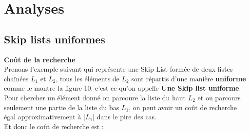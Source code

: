 \documentclass[hidelinks,a4paper,12pt]{article}
\begin{document}
\newpage

 \section{Analyses}
 \subsection{Skip lists uniformes} 
 \textbf {Coût de la recherche} \\
Prenons l'exemple suivant qui représente une Skip List formée de deux listes chaînées $L_1$ et $L_2$, tous les éléments de $L_2$ sont répartis d'une manière \textbf{uniforme} comme le montre la figure 10. c'est ce qu'on appelle \textbf{Une Skip list uniforme}. 
Pour chercher un élément donné on parcoure la liste du haut $L_2$ et on parcours seulement une partie de la liste du bas $L_1$, on peut avoir un coût de recherche égal approximativement à |$L_1$| dans le pire des cas. \\Et donc le coût de recherche est \cite{ArticleSchwar}:

\end{document}
